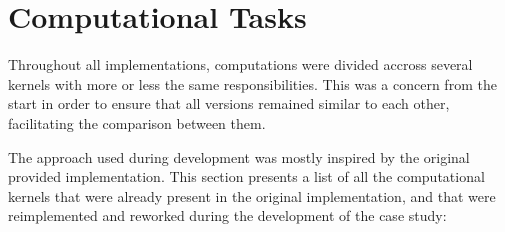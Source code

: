 \documentclass[main.tex]{subfiles}
\begin{document}
\section{Computational Tasks} \label{section:kernels}

Throughout all implementations, computations were divided accross several kernels with more or less the same responsibilities. This was a concern from the start in order to ensure that all versions remained similar to each other, facilitating the comparison between them.

The approach used during development was mostly inspired by the original provided implementation. This section presents a list of all the computational kernels that were already present in the original implementation, and that were reimplemented and reworked during the development of the case study:
\end{document}
